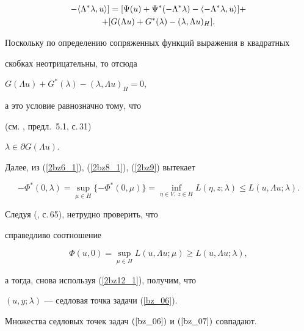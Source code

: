 \begin{pf}
\begin{gather*}
{- \la {\Lambda^* \lambda, u} \ra}]=


[{\Psi (u)+\Psi^* (- \Lambda^* \lambda) 


- \la {-\Lambda^* \lambda , u} \ra}]+ \\ +


[{G(\Lambda u)+G^*(\lambda) 


- ({\lambda, \Lambda u})_H}]. 


\end{gather*}


Поскольку по определению сопряженных функций выражения в квадратных 


скобках неотрицательны, то отсюда


$G(\Lambda u)+G^*(\lambda)-({\lambda, \Lambda u})_H=0$, 


а это условие равнозначно тому, что


(см. \cite{ET_79}, предл.~5.1, с.\,31)


$\lambda \in \partial G({\Lambda u})$.





Далее, из (\ref{2bz6_1}), (\ref{2bz8_1}), (\ref{2bz9}) вытекает


$$


- \Phi^* (0, \lambda)=


\sup_ {\mu \in H}\{-\Phi^* (0, \mu) \}=


\inf_{\eta \in V,\ z \in H} 


L (\eta, z; \lambda) \leq L (u, \Lambda u; \lambda).


$$


Следуя (\cite{ET_79}, с.\,65), нетрудно проверить, что


справедливо соотношение


$$


\Phi (u, 0)=\sup_{\mu \in H}


L (u, \Lambda u; \mu) \geq L (u, \Lambda u; \lambda),


$$


а тогда, снова используя (\ref{2bz12_1}), получим, что


$(u, y; \lambda)$ --- седловая точка задачи (\ref{bz_06}).


\end{pf}





\begin{thm} \label{bz_T2}


Множества седловых точек задач $(\ref{bz_06})$ и $(\ref{bz_07})$ совпадают.


\end{thm}





